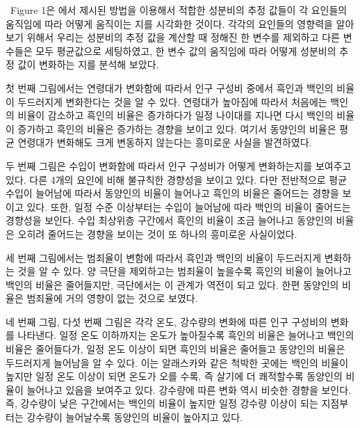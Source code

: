 \ \quad Figure 1은  \citet{jeon2018additive}에서 제시된 방법을 이용해서 적합한 성분비의 추정 값들이 각 요인들의 움직임에 따라 어떻게 움직이는 지를 시각화한 것이다. 각각의 요인들의 영향력을 알아보기 위해서 우리는 성분비의 추정 값을 계산할 때 정해진 한 변수를 제외하고 다른 변수들은 모두 평균값으로 세팅하였고, 한 변수 값의 움직임에 따라 어떻게 성분비의 추정 값이 변화하는 지를 분석해 보았다. 

첫 번째 그림에서는 연령대가 변화함에 따라서 인구 구성비 중에서 흑인과 백인의 비율이 두드러지게 변화한다는 것을 알 수 있다. 연령대가 높아짐에 따라서 처음에는 백인의 비율이 감소하고 흑인의 비율은 증가하다가 일정 나이대를 지나면 다시 백인의 비율이 증가하고 흑인의 비율은 증가하는 경향을 보이고 있다. 여기서 동양인의 비율은 평균 연령대가 변화해도 크게 변동하지 않는다는 흥미로운 사실을 발견하였다. 

두 번째 그림은 수입이 변화함에 따라서 인구 구성비가 어떻게 변화하는지를 보여주고 있다. 다른 4개의 요인에 비해 불규칙한 경향성을 보이고 있다. 다만 전반적으로 평균 수입이 늘어남에 따라서 동양인의 비율이 늘어나고 흑인의 비율은 줄어드는 경향을 보이고 있다. 또한, 일정 수준 이상부터는 수입이 늘어남에 따라 백인의 비율이 줄어드는 경향성을 보인다. 수입 최상위층 구간에서 흑인의 비율이 조금 늘어나고 동양인의 비율은 오히려 줄어드는 경향을 보이는 것이 또 하나의 흥미로운 사실이었다.

세 번째 그림에서는 범죄율이 변함에 따라서 흑인과 백인의 비율이 두드러지게 변화하는 것을 알 수 있다. 양 극단을 제외하고는 범죄율이 높을수록 흑인의 비율이 늘어나고 백인의 비율은 줄어들지만, 극단에서는 이 관계가 역전이 되고 있다. 한편 동양인의 비율은 범죄율에 거의 영향이 없는 것으로 보였다. 

네 번째 그림, 다섯 번째 그림은 각각 온도, 강수량의 변화에 따른 인구 구성비의 변화를 나타낸다. 일정 온도 이하까지는 온도가 높아질수록 흑인의 비율은 늘어나고 백인의 비율은 줄어들다가, 일정 온도 이상이 되면 흑인의 비율은 줄어들고 동양인의 비율은 두드러지게 늘어남을 알 수 있다. 이는 알래스카와 같은 척박한 곳에는 백인의 비율이 높지만 일정 온도 이상이 되면 온도가 오를 수록, 즉 살기에 더 쾌적할수록 동양인의 비율이 늘어나고 있음을 보여주고 있다. 강수량에 따른 변화 역시 비슷한 경향을 보인다. 즉, 강수량이 낮은 구간에서는 백인의 비율이 높지만 일정 강수량 이상이 되는 지점부터는 강수량이 늘어날수록 동양인의 비율이 높아지고 있다.

